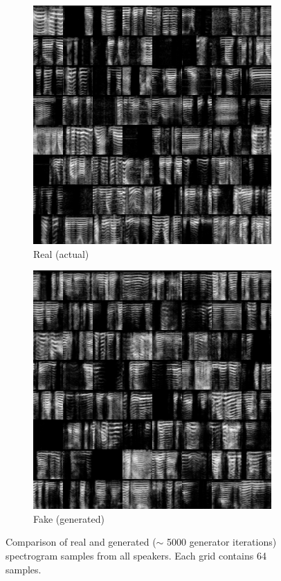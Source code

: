 \begin{figure}[h]
    \centering
    \begin{subfigure}[b]{0.4\textwidth}
        \includegraphics[width=\textwidth]{./fig/samples_groundtruth.png}
        \caption{Real (actual)}
        \label{fig:samples_real}
    \end{subfigure}
    \qquad
    \begin{subfigure}[b]{0.4\textwidth}
        \includegraphics[width=\textwidth]{./fig/samples_5419.png}
        \caption{Fake (generated)}
        \label{fig:samples_fake}
    \end{subfigure}
    \caption{Comparison of real and generated ($\sim$ 5000 generator iterations)
    spectrogram samples from all speakers. Each grid contains 64 samples.}
    \label{fig:samples_comparison}
\end{figure}

